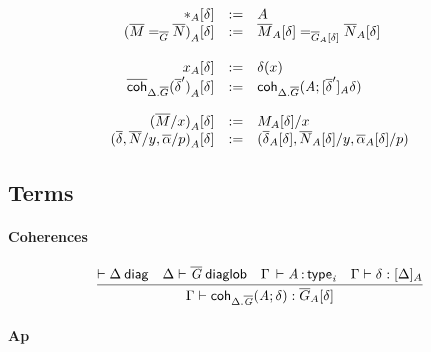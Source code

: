 \begin{small}
  \[
  \begin{array}{rcl}
    \interpglob{\diagbase}{A}{\delta} & := & A \\
    \interpglob{(\homj{\diag G}{\diag M}{\diag N})}{A}{\delta} & := &
    \homj{\interpglob{\diag G}{A}{\delta}}{\interpglob{\diag M}{A}{\delta}}
    {\interpglob{\diag N}{A}{\delta}}\\\\

    \interpglob{x}{A}{\delta} & := & \delta(x) \\
    \interpglob{\diagcoh{\Delta.\diag{G}}{\diag \delta'}}{A}{\delta} & := &
    \coh{\Delta.\diag G}{A}{\interpdiag{\diag\delta'}{A}{\delta}}\\\\

    \interpglob{(\diag M/x)}{A}{\delta} & := & \interpglob{M}{A}{\delta}/x \\
    \interpglob{(\diag \delta,\diag N/y,\diag \alpha/p)}{A}{\delta} & := &
    (\interpglob{\diag\delta}{A}{\delta},\interpglob{\diag N}{A}{\delta}/y,
    \interpglob{\diag\alpha}{A}{\delta}/p)
  \end{array}
  \]
\end{small}

\subsection{Terms}

\paragraph{Coherences}

\begin{small}
  \[
  \infer{\ofglob{\Gamma}{\coh{\ctx{\Delta}.\diag{G}}{A}{\delta}}
    {\interpglob{\diag{G}}{A}{\delta}}}
  {\wfdiag{\Delta}
    & \wfdiaglob{\Delta}{\diag G}
    & \oftp{\Gamma}{A}{\typ{i}}
    & \ofinterp{\Gamma}{\delta}{\Delta}{A}}
  \]
\end{small}

\paragraph{Ap}

